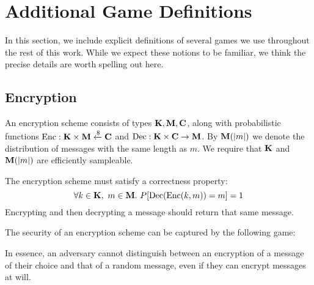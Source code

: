 \section{Additional Game Definitions}

In this section, we include explicit definitions of several games we
use throughout the rest of this work.
While we expect these notions to be familiar, we think the precise
details are worth spelling out here.

\subsection{Encryption}
\label{app:encryption}
An encryption scheme consists of types $\textbf{K}, \textbf{M}, \textbf{C}$,
along with probabilistic functions $\text{Enc} : \textbf{K} \times \textbf{M} \xleftarrow{\$} \textbf{C}$ and $\text{Dec} : \textbf{K} \times \textbf{C} \to \textbf{M}$.
By $\textbf{M}(|m|)$ we denote the distribution of messages with the same
length as $m$.
We require that $\textbf{K}$ and $\textbf{M}(|m|)$ are efficiently sampleable.

The encryption scheme must satisfy a correctness property:
$$
\forall k \in \txbf{K},\ m \in \txbf{M}.\ P[\tx{Dec}(\tx{Enc}(k, m)) = m] = 1
$$
Encrypting and then decrypting a message should return that same message.

The security of an encryption scheme can be captured by the following game:

In essence, an adversary cannot distinguish between an encryption of a message
of their choice and that of a random message, even if they can encrypt
messages at will.